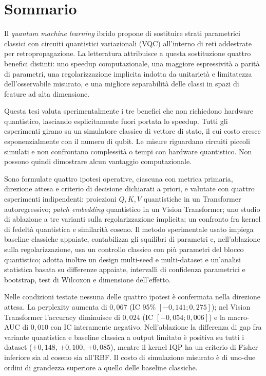 \chapter*{Sommario}

Il \emph{quantum machine learning} ibrido propone di sostituire strati parametrici
classici con circuiti quantistici variazionali (VQC) all'interno di reti addestrate
per retropropagazione. La letteratura attribuisce a questa sostituzione quattro
benefici distinti: uno speedup computazionale, una
maggiore espressività a parità di parametri, una regolarizzazione implicita
indotta da unitarietà e limitatezza dell'osservabile misurato, e una migliore
separabilità delle classi in spazi di feature ad alta dimensione.

Questa tesi valuta sperimentalmente i tre benefici che non richiedono hardware
quantistico, lasciando esplicitamente fuori portata lo speedup. Tutti gli
esperimenti girano su un simulatore classico di vettore di stato, il cui costo
cresce esponenzialmente con il numero di qubit. Le misure riguardano circuiti
piccoli simulati e non confrontano complessità o tempi con hardware quantistico.
Non possono quindi dimostrare alcun vantaggio computazionale.

Sono formulate quattro ipotesi operative, ciascuna con metrica primaria,
direzione attesa e criterio di decisione dichiarati a priori, e valutate
con quattro esperimenti indipendenti: proiezioni $Q,K,V$ quantistiche in un
Transformer autoregressivo; \emph{patch embedding} quantistico in un Vision
Transformer; uno studio di ablazione a tre varianti sulla regolarizzazione
implicita; un confronto fra kernel di fedeltà quantistica e similarità coseno.
Il metodo sperimentale usato impiega baseline classiche appaiate, contabilizza gli squilibri
di parametri e, nell'ablazione sulla regolarizzazione, usa un controllo classico
con più parametri del blocco quantistico; adotta inoltre un design multi-seed e
multi-dataset e un'analisi statistica basata su differenze appaiate, intervalli
di confidenza parametrici e bootstrap, test di Wilcoxon e dimensione dell'effetto.

Nelle condizioni testate nessuna delle quattro ipotesi è confermata nella
direzione attesa. La perplexity aumenta di $0{,}067$ (IC 95\%
$[-0{,}141;0{,}275]$); nel Vision Transformer l'accuracy diminuisce di $0{,}024$
(IC $[-0{,}054;0{,}006]$) e la macro-AUC di $0{,}010$ con IC interamente
negativo. Nell'ablazione la differenza di gap fra variante quantistica e baseline
classica a output limitato è positiva su tutti i dataset ($+0{,}148$, $+0{,}100$,
$+0{,}085$), mentre il kernel IQP ha
un criterio di Fisher inferiore sia al coseno sia all'RBF.
Il costo di simulazione misurato è di uno-due ordini di grandezza superiore a
quello delle baseline classiche.

